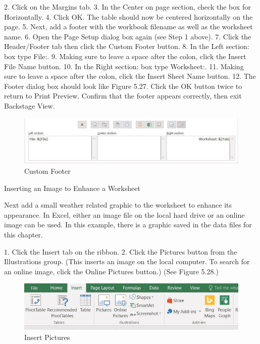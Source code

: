 2.   Click on the Margins tab.
3.   In the Center on page section, check the box for Horizontally.
4.   Click OK. The table should now be centered horizontally on the page.
5.   Next, add a footer with the workbook filename as well as the worksheet name.
6.   Open the Page Setup dialog box again (see Step 1 above).
7.   Click the Header/Footer tab then click the Custom Footer button.
8.   In the Left section: box type File:.
9.   Making sure to leave a space after the colon, click the Insert File Name button.
10.   In the Right section: box type Worksheet:.
11.   Making sure to leave a space after the colon, click the Insert Sheet Name button.
12.   The Footer dialog box should look like Figure 5.27. Click the OK button twice to return to Print
Preview. Confirm that the footer appears correctly, then exit Backstage View.



\begin{figure}[H]
	\centering
	\includegraphics[width=\maxwidth{.95\linewidth}]{gfx/ch05_fig27}
	\caption{Custom Footer}
	\label{05:fig27}
\end{figure}





Inserting an Image to Enhance a Worksheet

Next add a small weather related graphic to the worksheet to enhance its appearance. In Excel, either an image file on the local hard drive or an online image can be used. In this example, there is a graphic saved in the data files for this chapter.

1. Click the Insert tab on the ribbon.
2. Click the Pictures button from the Illustrations group. (This inserts an image on the local computer. To search for an online image, click the Online Pictures button.) (See Figure 5.28.)

\begin{figure}[H]
	\centering
	\includegraphics[width=\maxwidth{.95\linewidth}]{gfx/ch05_fig28}
	\caption{Insert Pictures}
	\label{05:fig28}
\end{figure}

